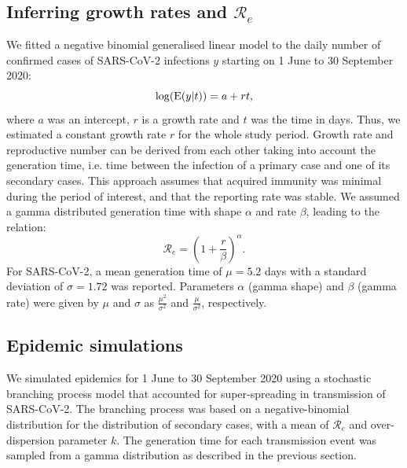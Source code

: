 \documentclass[10pt, a4paper, twoside]{article}
\begin{document}
\begin{multicols}{2}
\subsection{Inferring growth rates and $\mathcal{R}_e$}\label{marker}
We fitted a negative binomial generalised linear model to the daily number of confirmed cases of SARS-CoV-2 infections $y$ starting on 1 June to 30 September 2020:
\begin{equation}
	\log(\text E(y|t)) = a + r t,
\end{equation}
where $a$ was an intercept, $r$ is a growth rate and $t$ was the time in days.
Thus, we estimated a constant growth rate $r$ for the whole study period.
Growth rate and reproductive number can be derived from each other taking into account the generation time, i.e. time between the infection of a primary case and one of its secondary cases.\cite{wallinga_how_2007,krauer_heterogeneity_2016,svensson_note_2007}
This approach assumes that acquired immunity was minimal during the period of interest, and that  the reporting rate was stable.
We assumed a gamma distributed generation time with shape $\alpha$ and rate $\beta$, leading to the relation:
\begin{equation}
	\mathcal{R}_e = (1 + \frac{r}{\beta} )^\alpha.
\end{equation}
For SARS-CoV-2, a mean generation time of $\mu= 5.2$ days with a standard deviation of $\sigma = 1.72$ was reported.\cite{ganyani_estimating_2020}
Parameters $\alpha$ (gamma shape) and $\beta$ (gamma rate) were given by $\mu$ and $\sigma$ as $\frac{\mu^2}{\sigma^2 }$ and $\frac{\mu}{\sigma^2}$, respectively.

\subsection{Epidemic simulations}
We simulated epidemics for 1 June to 30 September 2020 using a stochastic branching process model that accounted for super-spreading in transmission of SARS-CoV-2.\cite{riou_pattern_2020}
The branching process was based on a negative-binomial distribution for the distribution of secondary cases, with a mean of $\mathcal{R}_e$ and over-dispersion parameter $k$.
The generation time for each transmission event was sampled from a gamma distribution as described in the previous section.


\end{multicols}
\end{document}
